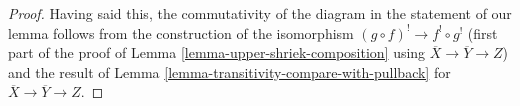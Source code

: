 \documentclass[10pt,a4paper]{amsart}
\theoremstyle{plain}
\theoremstyle{definition}
\theoremstyle{remark}
\numberwithin{equation}{subsection}
\begin{document}
\begin{proof}
\medskip\noindent
Having said this, the commutativity of the diagram in the statement
of our lemma follows from the construction of the isomorphism
$(g \circ f)^! \to f^! \circ g^!$ (first part of the proof of
Lemma \ref{lemma-upper-shriek-composition} using
$\overline{X} \to \overline{Y} \to Z$) and the result
of Lemma \ref{lemma-transitivity-compare-with-pullback}
for $\overline{X} \to \overline{Y} \to Z$.
\end{proof}
\end{document}
